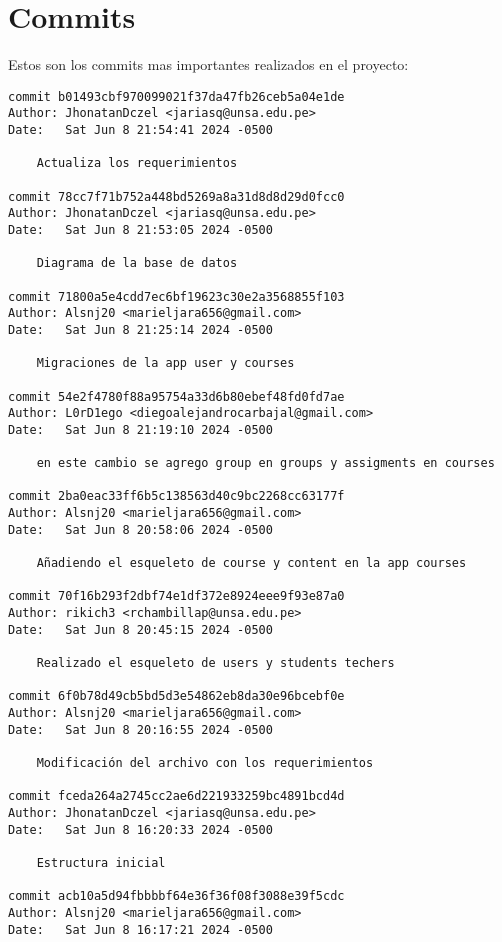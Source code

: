 \section{Commits}

Estos son los commits mas importantes realizados en el proyecto:

\begin{Verbatim}[language=bash]
commit b01493cbf970099021f37da47fb26ceb5a04e1de
Author: JhonatanDczel <jariasq@unsa.edu.pe>
Date:   Sat Jun 8 21:54:41 2024 -0500

    Actualiza los requerimientos

commit 78cc7f71b752a448bd5269a8a31d8d8d29d0fcc0
Author: JhonatanDczel <jariasq@unsa.edu.pe>
Date:   Sat Jun 8 21:53:05 2024 -0500

    Diagrama de la base de datos

commit 71800a5e4cdd7ec6bf19623c30e2a3568855f103
Author: Alsnj20 <marieljara656@gmail.com>
Date:   Sat Jun 8 21:25:14 2024 -0500

    Migraciones de la app user y courses

commit 54e2f4780f88a95754a33d6b80ebef48fd0fd7ae
Author: L0rD1ego <diegoalejandrocarbajal@gmail.com>
Date:   Sat Jun 8 21:19:10 2024 -0500

    en este cambio se agrego group en groups y assigments en courses

commit 2ba0eac33ff6b5c138563d40c9bc2268cc63177f
Author: Alsnj20 <marieljara656@gmail.com>
Date:   Sat Jun 8 20:58:06 2024 -0500

    Añadiendo el esqueleto de course y content en la app courses

commit 70f16b293f2dbf74e1df372e8924eee9f93e87a0
Author: rikich3 <rchambillap@unsa.edu.pe>
Date:   Sat Jun 8 20:45:15 2024 -0500

    Realizado el esqueleto de users y students techers

commit 6f0b78d49cb5bd5d3e54862eb8da30e96bcebf0e
Author: Alsnj20 <marieljara656@gmail.com>
Date:   Sat Jun 8 20:16:55 2024 -0500

    Modificación del archivo con los requerimientos

commit fceda264a2745cc2ae6d221933259bc4891bcd4d
Author: JhonatanDczel <jariasq@unsa.edu.pe>
Date:   Sat Jun 8 16:20:33 2024 -0500

    Estructura inicial

commit acb10a5d94fbbbbf64e36f36f08f3088e39f5cdc
Author: Alsnj20 <marieljara656@gmail.com>
Date:   Sat Jun 8 16:17:21 2024 -0500


\end{Verbatim}
